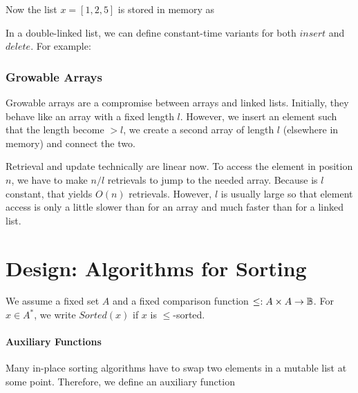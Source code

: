 Now the list $x=[1,2,5]$ is stored in memory as
\begin{amemory}
\alocations
{}
\hline
{}
\hline
{}
\hline
{}
\end{amemory}

In a double-linked list, we can define constant-time variants for both $insert$ and $delete$.
For example:
\begin{acode}
\end{acode}


\subsubsection{Growable Arrays}

Growable arrays are a compromise between arrays and linked lists.
Initially, they behave like an array with a fixed length $l$.
However, we insert an element such that the length become $>l$, we create a second array of length $l$ (elsewhere in memory) and connect the two.

Retrieval and update technically are linear now.
To access the element in position $n$, we have to make $n/l$ retrievals to jump to the needed array.
Because is $l$ constant, that yields $O(n)$ retrievals.
However, $l$ is usually large so that element access is only a little slower than for an array and much faster than for a linked list.

\section{Design: Algorithms for Sorting}\label{sec:ad:sort:algo}

We assume a fixed set $A$ and a fixed comparison function $\leq:A\times A \to \mathbb{B}$.
For $x\in A^*$, we write $Sorted(x)$ if $x$ is $\leq$-sorted.

\paragraph{Auxiliary Functions}
Many in-place sorting algorithms have to swap two elements in a mutable list at some point.
Therefore, we define an auxiliary function


